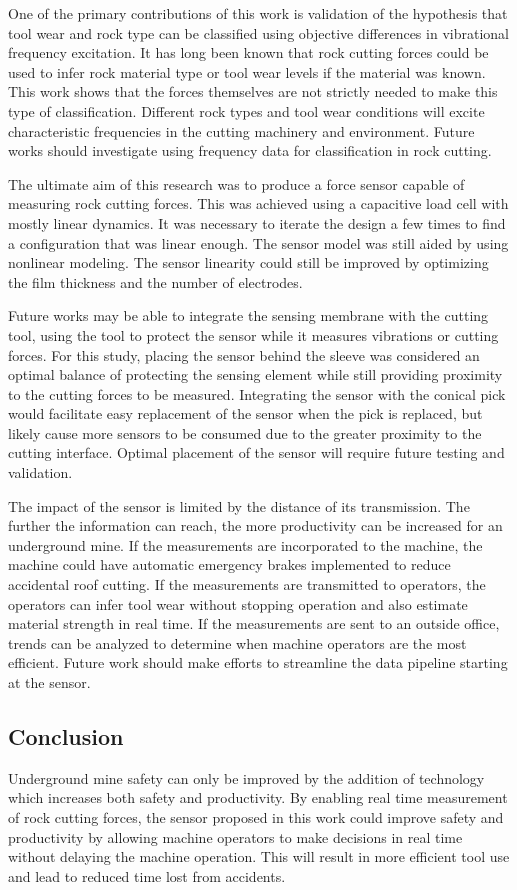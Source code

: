 One of the primary contributions of this work is validation of the hypothesis that tool wear and rock type can be 
classified using objective differences in vibrational frequency excitation. It has long been known that rock cutting forces
could be used to infer rock material type or tool wear levels if the material was known. This work shows that
the forces themselves are not strictly needed to make this type of classification. Different rock types and tool wear conditions
will excite characteristic frequencies in the cutting machinery and environment.
Future works should investigate using frequency data for classification in rock cutting.

The ultimate aim of this research was to produce a force sensor capable of measuring rock cutting forces. 
This was achieved using a capacitive load cell with mostly linear dynamics. It was necessary to iterate the design
a few times to find a configuration that was linear enough. The sensor model was still aided by using nonlinear modeling.
The sensor linearity could still be improved by optimizing the film thickness and the number of electrodes.

Future works may be able to integrate the sensing membrane with the cutting tool,
using the tool to protect the sensor while it measures vibrations or cutting forces.
For this study, placing the sensor behind the sleeve was considered an optimal balance of 
protecting the sensing element while still providing proximity to the cutting forces to be measured.
Integrating the sensor with the conical pick would facilitate easy replacement of the sensor when the pick is replaced,
but likely cause more sensors to be consumed due to the greater proximity to the cutting interface.
Optimal placement of the sensor will require future testing and validation.

The impact of the sensor is limited by the distance of its transmission. 
The further the information can reach, the more productivity can be increased for an underground mine.
If the measurements are incorporated to the machine, the machine could have automatic emergency brakes 
implemented to reduce accidental roof cutting. If the measurements are transmitted to operators, the operators
can infer tool wear without stopping operation and also estimate material strength in real time.
If the measurements are sent to an outside office, trends can be analyzed to determine when machine operators
are the most efficient. Future work should make efforts to streamline the data pipeline starting at the sensor.

\subsection{Conclusion}

Underground mine safety can only be improved by the addition of technology which increases both safety and 
productivity. By enabling real time measurement of rock cutting forces, the sensor proposed in this work
could improve safety and productivity by allowing machine operators to make decisions in real time without delaying
the machine operation. This will result in more efficient tool use and lead to reduced time lost from accidents.


